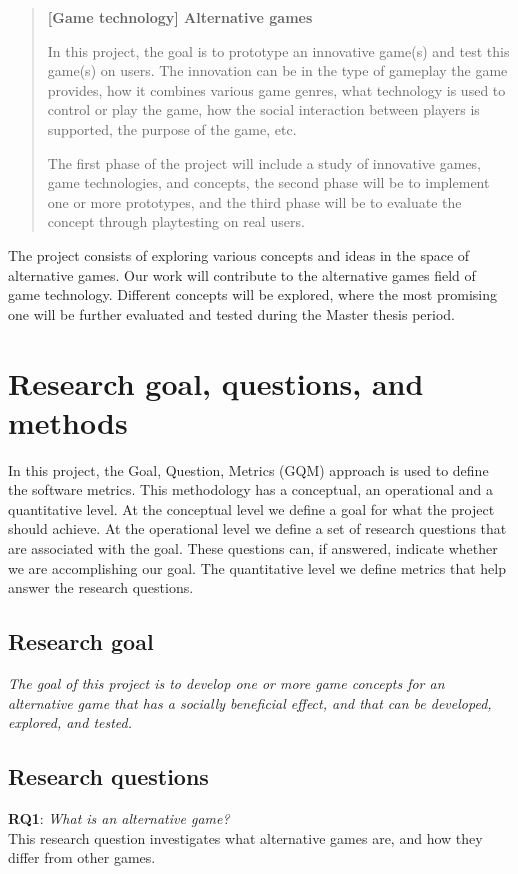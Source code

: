 \documentclass[../Main.tex]{subfiles}
\begin{document}
\blockquote{
\textbf{[Game technology] Alternative games}

In this project, the goal is to prototype an innovative game(s) and test this game(s) on users. The innovation can be in the type of gameplay the game provides, how it combines various game genres, what technology is used to control or play the game, how the social interaction between players is supported, the purpose of the game, etc.

The first phase of the project will include a study of innovative games, game technologies, and concepts, the second phase will be to implement one or more prototypes, and the third phase will be to evaluate the concept through playtesting on real users.}

The project consists of exploring various concepts and ideas in the space of alternative games. Our work will contribute to the alternative games field of game technology. Different concepts will be explored, where the most promising one will be further evaluated and tested during the Master thesis period.

\section{Research goal, questions, and methods}
In this project, the Goal, Question, Metrics (GQM) approach \cite{basili_software_1992} is used to define the software metrics. This methodology has a conceptual, an operational and a quantitative level. At the conceptual level we define a goal for what the project should achieve. At the operational level we define a set of research questions that are associated with the goal. These questions can, if answered, indicate whether we are accomplishing our goal. The quantitative level we define metrics that help answer the research questions.


\subsection{Research goal}
\textit{The goal of this project is to develop one or more game concepts for an alternative game that has a socially beneficial effect, and that can be developed, explored, and tested.}

\subsection{Research questions}
\textbf{RQ1}: \textit{What is an alternative game?} \\
This research question investigates what alternative games are, and how they differ from other games.
\end{document}
